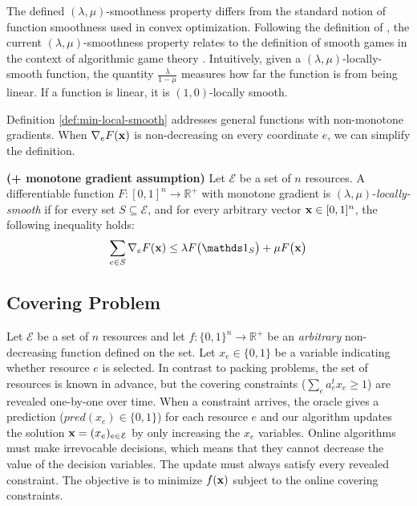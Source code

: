 The defined $(\lambda,\mu)$-smoothness property differs from the standard notion of function smoothness used in
convex optimization. Following the definition of \cite{Thang20:Online-Primal-Dual}, the current $(\lambda,\mu)$-smoothness property relates to the definition of smooth games in the context of algorithmic game theory \cite{Roughgarden15:Intrinsic-Robustness}. Intuitively, given a $(\lambda,\mu)$-locally-smooth function,
the quantity $\frac{\lambda}{1-\mu}$ measures how far the function is from being linear. If a function is linear, it is $(1,0)$-locally smooth.

Definition \ref{def:min-local-smooth} addresses general functions with non-monotone gradients. When $\nabla_{e} F(\mathbf{x})$ is non-decreasing on every coordinate $e$, we can simplify the definition.

\begin{definition} \textbf{(+ monotone gradient assumption)} \label{def:min-local-smooth-increasing}
    Let $\mathcal{E}$ be a set of $n$ resources.
    A differentiable function $F: [0,1]^{n} \rightarrow \mathbb{R}^{+}$ with monotone gradient is $(\lambda,\mu)$-\emph{locally-smooth} if for every set $S \subseteq \mathcal{E}$, and for every arbitrary vector $\mathbf{x} \in [0,1]^{n}$, the following inequality holds:
    \begin{equation*} \label{eq:min-local-smooth-increasing}
        \sum_{e \in S} \nabla_{e} F(\vect{x}) \leq \lambda F\bigl( \one_{S} \bigr) + \mu F\bigl( \vect{x} \bigr)
    \end{equation*}
\end{definition}


\subsection{Covering Problem}
Let $\mathcal{E}$ be a set of $n$ resources
and let $f: \{0,1\}^{n} \rightarrow \mathbb{R}^{+}$ be an  \emph{arbitrary} non-decreasing function defined on the set.
Let $x_{e} \in \{0,1\}$ be a variable indicating whether resource $e$ is selected.
In contrast to packing problems, the set of resources is known in advance, but the covering constraints ($\sum_{e} a_{e}^{t} x_{e} \geq 1$) are revealed one-by-one over time. When a constraint arrives, the oracle gives a prediction ($pred(x_{e}) \in \{0,1\}$) for each resource $e$ and our algorithm updates the solution $\mathbf{x} = (x_{e})_{e \in \mathcal{E}}$ by only increasing the $x_e$ variables. Online algorithms must make irrevocable decisions, which means that they cannot decrease the value of the decision variables. The update must always satisfy every revealed constraint.
The objective is to minimize $f(\mathbf{x})$ subject to the online covering constraints.
